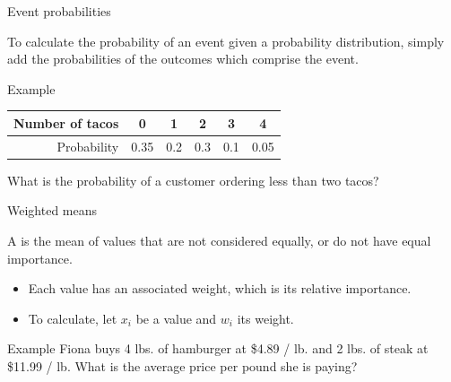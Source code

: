\documentclass[xcolor=table, aspectratio=169, bigger]{beamer}
\begin{document}
\begin{frame}{Event probabilities}
\begin{block}{}
To calculate the probability of an event given a probability distribution, simply add the probabilities of the outcomes which comprise the event.
\end{block}
\pause
\begin{exampleblock}{Example}
{\centering \tabspacemed
\begin{tabular}{r | c cccc}
Number of tacos & 0 & 1 & 2 & 3 & 4\\
\hline
Probability &  0.35 & 0.2 & 0.3 & 0.1 & 0.05
\end{tabular}\par
}
\bigskip
What is the probability of a customer ordering less than two tacos?\\ \smallskip
\pause
{}
\end{exampleblock}
\end{frame}

\begin{frame}{Weighted means}
\begin{block}{}
A  is the mean of values that are not considered equally, or do not have equal importance.
\begin{itemize}
\item Each value has an associated weight, which is its relative importance.
\item To calculate, let $x_i$ be a value and $w_i$ its weight. \\ \smallskip
{}
\end{itemize}
\end{block}
\pause
\begin{exampleblock}{Example}
Fiona buys 4 lbs. of hamburger at \$4.89 / lb. and 2 lbs. of steak at \$11.99 / lb. What is the average price per pound she is paying?\\ \smallskip 
\pause
{}
\end{exampleblock}
\end{frame}
\end{document}
